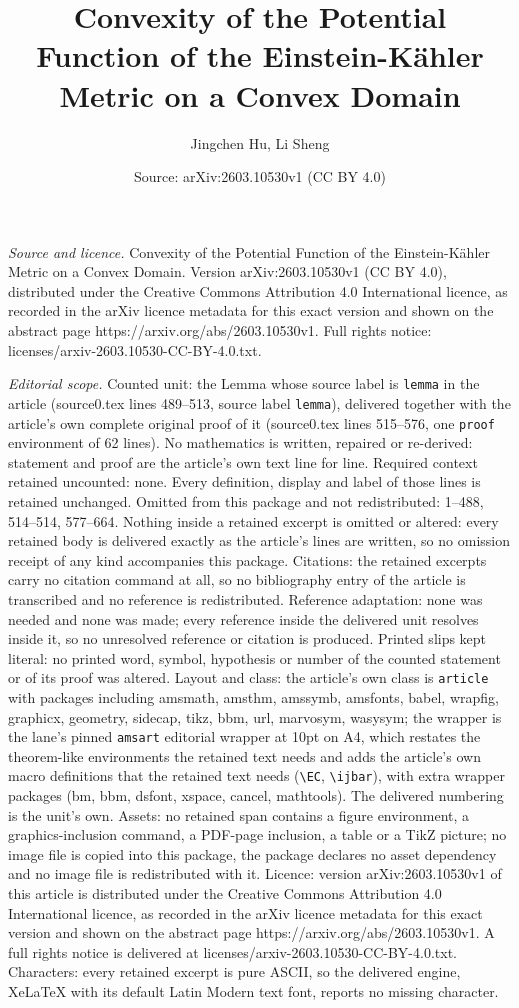 \documentclass[10pt,a4paper]{amsart}
\title[Convexity of the Potential Function of the Einstein-K\"ahler]{Convexity of the Potential Function of the Einstein-K\"ahler Metric on a Convex Domain}
\author{Jingchen Hu, Li Sheng}
\date{Source: arXiv:2603.10530v1 (CC BY 4.0)}
\begin{document}
\maketitle

\noindent\emph{Source and licence.} Convexity of the Potential Function of the Einstein-K\"ahler Metric on a Convex Domain. Version arXiv:2603.10530v1 (CC BY 4.0), distributed under the Creative Commons Attribution 4.0 International licence, as recorded in the arXiv licence metadata for this exact version and shown on the abstract page https://arxiv.org/abs/2603.10530v1. Full rights notice: licenses/arxiv-2603.10530-CC-BY-4.0.txt.\par\smallskip

\noindent\textit{Editorial scope.} Counted unit: the Lemma whose source label is \texttt{lemma} in the article (source0.tex lines 489--513, source label \texttt{lemma}), delivered together with the article's own complete original proof of it (source0.tex lines 515--576, one \texttt{proof} environment of 62 lines). No mathematics is written, repaired or re-derived: statement and proof are the article's own text line for line. Required context retained uncounted: none. Every definition, display and label of those lines is retained unchanged. Omitted from this package and not redistributed: 1--488, 514--514, 577--664. Nothing inside a retained excerpt is omitted or altered: every retained body is delivered exactly as the article's lines are written, so no omission receipt of any kind accompanies this package. Citations: the retained excerpts carry no citation command at all, so no bibliography entry of the article is transcribed and no reference is redistributed. Reference adaptation: none was needed and none was made; every reference inside the delivered unit resolves inside it, so no unresolved reference or citation is produced. Printed slips kept literal: no printed word, symbol, hypothesis or number of the counted statement or of its proof was altered. Layout and class: the article's own class is \texttt{article} with packages including amsmath, amsthm, amssymb, amsfonts, babel, wrapfig, graphicx, geometry, sidecap, tikz, bbm, url, marvosym, wasysym; the wrapper is the lane's pinned \texttt{amsart} editorial wrapper at 10pt on A4, which restates the theorem-like environments the retained text needs and adds the article's own macro definitions that the retained text needs (\texttt{\textbackslash EC}, \texttt{\textbackslash ijbar}), with extra wrapper packages (bm, bbm, dsfont, xspace, cancel, mathtools). The delivered numbering is the unit's own. Assets: no retained span contains a figure environment, a graphics-inclusion command, a PDF-page inclusion, a table or a TikZ picture; no image file is copied into this package, the package declares no asset dependency and no image file is redistributed with it. Licence: version arXiv:2603.10530v1 of this article is distributed under the Creative Commons Attribution 4.0 International licence, as recorded in the arXiv licence metadata for this exact version and shown on the abstract page https://arxiv.org/abs/2603.10530v1. A full rights notice is delivered at licenses/arxiv-2603.10530-CC-BY-4.0.txt. Characters: every retained excerpt is pure ASCII, so the delivered engine, XeLaTeX with its default Latin Modern text font, reports no missing character.
\end{document}
